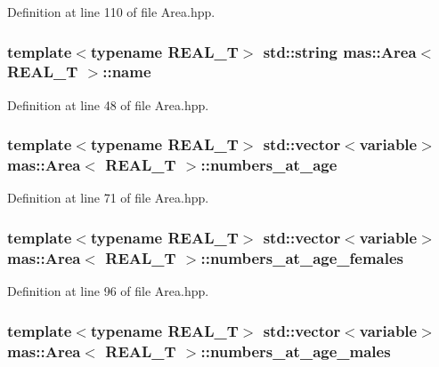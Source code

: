 Definition at line 110 of file Area.\-hpp.

\hypertarget{structmas_1_1_area_a03c8c1768c367f3251dfca8adffeb780}{
\subsubsection[{name}]{\setlength{\rightskip}{0pt plus 5cm}template$<$typename R\-E\-A\-L\-\_\-\-T$>$ std\-::string {\bf mas\-::\-Area}$<$ R\-E\-A\-L\-\_\-\-T $>$\-::name}}\label{structmas_1_1_area_a03c8c1768c367f3251dfca8adffeb780}


Definition at line 48 of file Area.\-hpp.

\hypertarget{structmas_1_1_area_aa9febdb0cb6d7832ce2d5f915795a886}{
\subsubsection[{numbers\-\_\-at\-\_\-age}]{\setlength{\rightskip}{0pt plus 5cm}template$<$typename R\-E\-A\-L\-\_\-\-T$>$ std\-::vector$<${\bf variable}$>$ {\bf mas\-::\-Area}$<$ R\-E\-A\-L\-\_\-\-T $>$\-::numbers\-\_\-at\-\_\-age}}\label{structmas_1_1_area_aa9febdb0cb6d7832ce2d5f915795a886}


Definition at line 71 of file Area.\-hpp.

\hypertarget{structmas_1_1_area_a4ee583e6a3480b7216f38c9ebe8b8f60}{
\subsubsection[{numbers\-\_\-at\-\_\-age\-\_\-females}]{\setlength{\rightskip}{0pt plus 5cm}template$<$typename R\-E\-A\-L\-\_\-\-T$>$ std\-::vector$<${\bf variable}$>$ {\bf mas\-::\-Area}$<$ R\-E\-A\-L\-\_\-\-T $>$\-::numbers\-\_\-at\-\_\-age\-\_\-females}}\label{structmas_1_1_area_a4ee583e6a3480b7216f38c9ebe8b8f60}


Definition at line 96 of file Area.\-hpp.

\hypertarget{structmas_1_1_area_abd69833d78a921fd8c8b13140e46ad06}{
\subsubsection[{numbers\-\_\-at\-\_\-age\-\_\-males}]{\setlength{\rightskip}{0pt plus 5cm}template$<$typename R\-E\-A\-L\-\_\-\-T$>$ std\-::vector$<${\bf variable}$>$ {\bf mas\-::\-Area}$<$ R\-E\-A\-L\-\_\-\-T $>$\-::numbers\-\_\-at\-\_\-age\-\_\-males}}\label{structmas_1_1_area_abd69833d78a921fd8c8b13140e46ad06}


